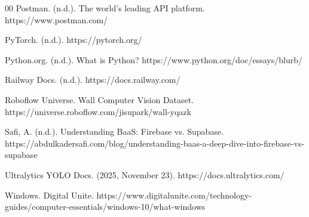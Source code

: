 \documentclass[conference]{IEEEtran}
\begin{document}
\begin{thebibliography}{00}
Postman. (n.d.). The world’s leading API platform. https://www.postman.com/

PyTorch. (n.d.). https://pytorch.org/

Python.org. (n.d.). What is Python? https://www.python.org/doc/essays/blurb/

Railway Docs. (n.d.). https://docs.railway.com/

Roboflow Universe. Wall Computer Vision Dataset. https://universe.roboflow.com/jisupark/wall-yqazk

Safi, A. (n.d.). Understanding BaaS: Firebase vs. Supabase. https://abdulkadersafi.com/blog/understanding-baas-a-deep-dive-into-firebase-vs-supabase

Ultralytics YOLO Docs. (2025, November 23). https://docs.ultralytics.com/

Windows. Digital Unite. https://www.digitalunite.com/technology-guides/computer-essentials/windows-10/what-windows

\end{thebibliography}



\vspace{12pt}
\end{document}
